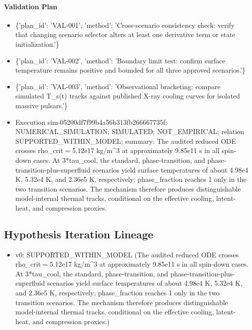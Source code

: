 \documentclass[11pt]{article}
\begin{document}
\paragraph{Validation Plan}
\begin{itemize}\raggedright
\item \{'plan\_\allowbreak{}id': 'VAL-001', 'method': 'Cross-scenario consistency check: verify that changing scenario selector alters at least one derivative term or state initialization.'\}
\item \{'plan\_\allowbreak{}id': 'VAL-002', 'method': 'Boundary limit test: confirm surface temperature remains positive and bounded for all three approved scenarios.'\}
\item \{'plan\_\allowbreak{}id': 'VAL-003', 'method': 'Observational bracketing: compare simulated T\_\allowbreak{}s(t) tracks against published X-ray cooling curves for isolated massive pulsars.'\}
\end{itemize}

\begin{itemize}
\item Execution sim-05200df7f99b4a56b313fb266667735f; NUMERICAL\_SIMULATION; SIMULATED; NOT\_EMPIRICAL; relation SUPPORTED\_WITHIN\_MODEL; summary: The audited reduced ODE crosses rho\_crit\ensuremath{=}5.12e17 kg/m\textasciicircum{}3 at approximately 9.85e11 s in all spin-down cases. At 3*tau\_cool, the standard, phase-transition, and phase-transition-plus-superfluid scenarios yield surface temperatures of about 4.98e4 K, 5.32e4 K, and 2.36e5 K, respectively; phase\_fraction reaches 1 only in the two transition scenarios. The mechanism therefore produces distinguishable model-internal thermal tracks, conditional on the effective cooling, latent-heat, and compression proxies.
\end{itemize}

\subsection{Hypothesis Iteration Lineage}

\begin{itemize}\raggedright
\item v0: SUPPORTED\_\allowbreak{}WITHIN\_\allowbreak{}MODEL (The audited reduced ODE crosses rho\_\allowbreak{}crit\ensuremath{=}5.12e17 kg/\allowbreak{}m\textasciicircum{}3 at approximately 9.85e11 s in all spin-down cases. At 3*tau\_\allowbreak{}cool, the standard, phase-transition, and phase-transition-plus-superfluid scenarios yield surface temperatures of about 4.98e4 K, 5.32e4 K, and 2.36e5 K, respectively; phase\_\allowbreak{}fraction reaches 1 only in the two transition scenarios. The mechanism therefore produces distinguishable model-internal thermal tracks, conditional on the effective cooling, latent-heat, and compression proxies.)
\end{itemize}
\end{document}
